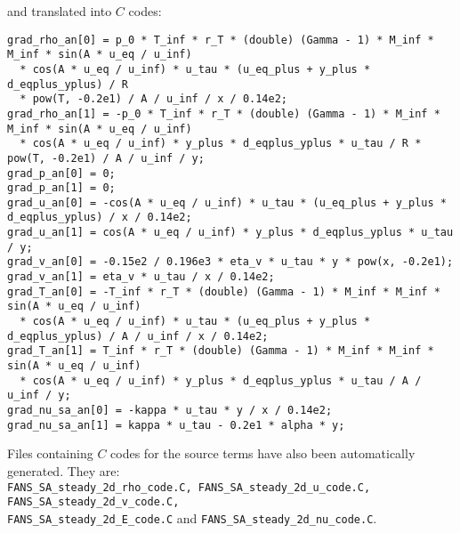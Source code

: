 \documentclass[10pt]{article}
\begin{document}
 and translated into $C$ codes:
\begin{small}
\begin{verbatim}
grad_rho_an[0] = p_0 * T_inf * r_T * (double) (Gamma - 1) * M_inf * M_inf * sin(A * u_eq / u_inf) 
  * cos(A * u_eq / u_inf) * u_tau * (u_eq_plus + y_plus * d_eqplus_yplus) / R 
  * pow(T, -0.2e1) / A / u_inf / x / 0.14e2;
grad_rho_an[1] = -p_0 * T_inf * r_T * (double) (Gamma - 1) * M_inf * M_inf * sin(A * u_eq / u_inf) 
  * cos(A * u_eq / u_inf) * y_plus * d_eqplus_yplus * u_tau / R * pow(T, -0.2e1) / A / u_inf / y;
grad_p_an[0] = 0;
grad_p_an[1] = 0;
grad_u_an[0] = -cos(A * u_eq / u_inf) * u_tau * (u_eq_plus + y_plus * d_eqplus_yplus) / x / 0.14e2;
grad_u_an[1] = cos(A * u_eq / u_inf) * y_plus * d_eqplus_yplus * u_tau / y;
grad_v_an[0] = -0.15e2 / 0.196e3 * eta_v * u_tau * y * pow(x, -0.2e1);
grad_v_an[1] = eta_v * u_tau / x / 0.14e2;
grad_T_an[0] = -T_inf * r_T * (double) (Gamma - 1) * M_inf * M_inf * sin(A * u_eq / u_inf) 
  * cos(A * u_eq / u_inf) * u_tau * (u_eq_plus + y_plus * d_eqplus_yplus) / A / u_inf / x / 0.14e2;
grad_T_an[1] = T_inf * r_T * (double) (Gamma - 1) * M_inf * M_inf * sin(A * u_eq / u_inf) 
  * cos(A * u_eq / u_inf) * y_plus * d_eqplus_yplus * u_tau / A / u_inf / y;
grad_nu_sa_an[0] = -kappa * u_tau * y / x / 0.14e2;
grad_nu_sa_an[1] = kappa * u_tau - 0.2e1 * alpha * y;
\end{verbatim}
\end{small}
Files containing $C$ codes for the source terms have also been automatically generated. They are:\\ \texttt{FANS\_SA\_steady\_2d\_rho\_code.C, FANS\_SA\_steady\_2d\_u\_code.C, FANS\_SA\_steady\_2d\_v\_code.C,\\ FANS\_SA\_steady\_2d\_E\_code.C} and \texttt{FANS\_SA\_steady\_2d\_nu\_code.C}.
\end{document}
